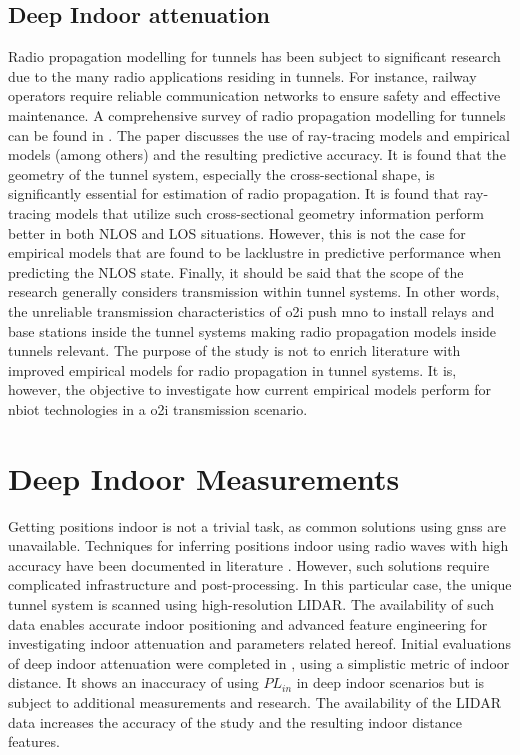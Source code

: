 \subsection{Deep Indoor attenuation}
Radio propagation modelling for tunnels has been subject to significant research due to the many radio applications residing in tunnels. For instance, railway operators require reliable communication networks to ensure safety and effective maintenance. A comprehensive survey of radio propagation modelling for tunnels can be found in \cite{Hrovat2014ATunnels}. The paper discusses the use of ray-tracing models and empirical models (among others) and the resulting predictive accuracy. It is found that the geometry of the tunnel system, especially the cross-sectional shape, is significantly essential for estimation of radio propagation. It is found that ray-tracing models that utilize such cross-sectional geometry information perform better in both NLOS and LOS situations. However, this is not the case for empirical models that are found to be lacklustre in predictive performance when predicting the NLOS state. Finally, it should be said that the scope of the research generally considers transmission within tunnel systems. In other words, the unreliable transmission characteristics of \gls{o2i} push \acrlong{mno} to install relays and base stations inside the tunnel systems making radio propagation models inside tunnels relevant. The purpose of the study is not to enrich literature with improved empirical models for radio propagation in tunnel systems. It is, however, the objective to investigate how current empirical models perform for \gls{nbiot} technologies in a \gls{o2i} transmission scenario.

\section{Deep Indoor Measurements}
Getting positions indoor is not a trivial task, as common solutions using \gls{gnss} are unavailable. Techniques for inferring positions indoor using radio waves with high accuracy have been documented in literature \cite{Nuaimi2011}. However, such solutions require complicated infrastructure and post-processing. In this particular case, the unique tunnel system is scanned using high-resolution LIDAR. The availability of such data enables accurate indoor positioning and advanced feature engineering for investigating indoor attenuation and parameters related hereof.  Initial evaluations of deep indoor attenuation were completed in \cite{Malarski2019InvestigationAttenuation}, using a simplistic metric of indoor distance. It shows an inaccuracy of using $PL_{in}$ in deep indoor scenarios but is subject to additional measurements and research. The availability of the LIDAR data increases the accuracy of the study and the resulting indoor distance features. 



